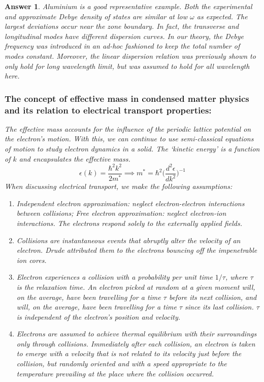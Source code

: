 \documentclass[a4paper]{article}
\newtheorem{ans}{Answer}[subsection]
\theoremstyle{new}
\begin{document}
\begin{ans}
Aluminium is a good representative example. Both the experimental and approximate Debye density of states are similar at low $\omega$ as expected. The largest deviations occur near the zone boundary. In fact, the transverse and longitudinal modes have different dispersion curves. In our theory, the Debye frequency was introduced in an ad-hoc fashioned to keep the total number of modes constant. Moreover, the linear dispersion relation was previously shown to only hold for long wavelength limit, but was assumed to hold for all wavelength here.
\subsubsection*{The concept of effective mass in condensed matter physics and its relation to electrical transport properties:}
The effective mass accounts for the influence of the periodic lattice potential on the electron's motion. With this, we can continue to use semi-classical equations of motion to study electron dynamics in a solid. The `kinetic energy' is a function of $k$ and encapsulates the effective mass.
$$\epsilon(k)=\frac{\hbar^2k^2}{2m^*}\implies m^*=\hbar^2\bigg(\frac{d^2\epsilon}{dk^2}\bigg)^{-1}$$
When discussing electrical transport, we make the following assumptions:
\begin{enumerate}
    \item Independent electron approximation: neglect electron-electron interactions between collisions; Free electron approximation: neglect electron-ion interactions. The electrons respond solely to the externally applied fields.
    \item Collisions are instantaneous events that abruptly alter the velocity of an electron. Drude attributed them to the electrons bouncing off the impenetrable ion cores.
    \item Electron experiences a collision with a probability per unit time $1/\tau$, where $\tau$ is the relaxation time. An electron picked at random at a given moment will, on the average, have been travelling for a time $\tau$ before its next collision, and will, on the average, have been travelling for a time $\tau$ since its last collision. $\tau$ is independent of the electron's position and velocity.
    \item Electrons are assumed to achieve thermal equilibrium with their surroundings only through collisions. Immediately after each collision, an electron is taken to emerge with a velocity that is not related to its velocity just before the collision, but randomly oriented and with a speed appropriate to the temperature prevailing at the place where the collision occurred.

\end{enumerate}
\end{ans}
\end{document}
